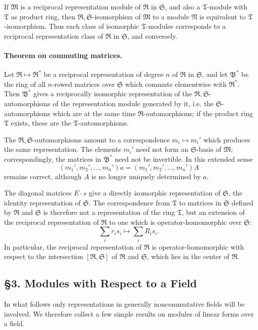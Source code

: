 \documentclass[11pt]{article}
\providecommand{\frR}{\mathfrak R}
\providecommand{\frS}{\mathfrak S}
\providecommand{\frT}{\mathfrak T}
\providecommand{\frM}{\mathfrak M}
\providecommand{\frN}{\mathfrak N}
\providecommand{\frB}{\mathfrak B}
\begin{document}
If \(\frM\) is a reciprocal representation module of \(\frR\) in \(\frS\), and also a \(\frT\)-module with \(\frT\) as product ring, then \(\frR,\frS\)-isomorphism of \(\frM\) to a module \(\frN\) is equivalent to \(\frT\)-isomorphism. Thus each class of isomorphic \(\frT\)-modules corresponds to a reciprocal representation class of \(\frR\) in \(\frS\), and conversely.

\paragraph{Theorem on commuting matrices.}
Let \(\frR\mapsto\frR^*\) be a reciprocal representation of degree \(n\) of \(\frR\) in \(\frS\), and let \(\frB^*\) be the ring of all \(n\)-rowed matrices over \(\frS\) which commute elementwise with \(\frR^*\). Then \(\frB^*\) gives a reciprocally isomorphic representation of the \(\frR,\frS\)-automorphisms of the representation module generated by it, i.e. the \(\frS\)-automorphisms which are at the same time \(\frR\)-automorphisms; if the product ring \(\frT\) exists, these are the \(\frT\)-automorphisms.

The \(\frR,\frS\)-automorphisms amount to a correspondence \(m_i\mapsto m_i'\) which produces the same representation. The elements \(m_i'\) need not form an \(\frS\)-basis of \(\frM\); correspondingly, the matrices in \(\frB^*\) need not be invertible. In this extended sense
\[
        (m_1',m_2',\ldots,m_n')a=(m_1',m_2',\ldots,m_n')A
\]
remains correct, although \(A\) is no longer uniquely determined by \(a\).

The diagonal matrices \(E\cdot s\) give a directly isomorphic representation of \(\frS\), the identity representation of \(\frS\). The correspondence from \(\frT\) to matrices in \(\frS\) defined by \(\frR\) and \(\frS\) is therefore not a representation of the ring \(\frT\), but an extension of the reciprocal representation of \(\frR\) to one which is operator-homomorphic over \(\frS\):
\[
        \sum_i r_i s_i\longmapsto \sum_i R_i s_i.
\]
In particular, the reciprocal representation of \(\frR\) is operator-homomorphic with respect to the intersection \([\frR,\frS]\) of \(\frR\) and \(\frS\), which lies in the center of \(\frR\).

\subsection*{§3. Modules with Respect to a Field}

In what follows only representations in generally noncommutative fields will be involved. We therefore collect a few simple results on modules of linear forms over a field.
\end{document}
